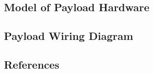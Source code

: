 \begin{center}
\subsection{Model of Payload Hardware}
\subsection{Payload Wiring Diagram}
\subsection{References}


\end{center}

